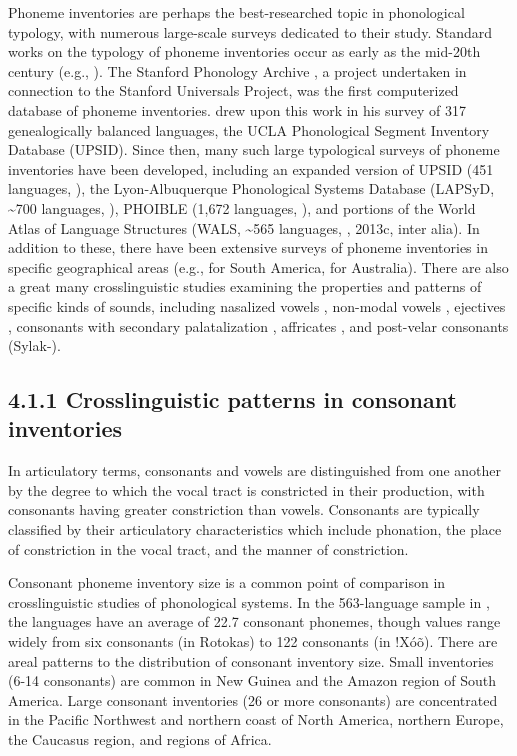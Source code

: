   Phoneme inventories are perhaps the best-researched topic in phonological typology, with numerous large-scale surveys dedicated to their study. Standard works on the typology of phoneme inventories occur as early as the mid-20th century (e.g., \citealt{Hockett1955}). The Stanford Phonology Archive \citep{CrothersEtAl1979}, a project undertaken in connection to the Stanford Universals Project, was the first computerized database of phoneme inventories. \citet{Maddieson1984} drew upon this work in his survey of 317 genealogically balanced languages, the UCLA Phonological Segment Inventory Database (UPSID). Since then, many such large typological surveys of phoneme inventories have been developed, including an expanded version of UPSID (451 languages, \citealt{MaddiesonPrecoda1990}), the Lyon-Albuquerque Phonological Systems Database (LAPSyD, {\textasciitilde}700 languages, \citealt{MaddiesonEtAl2013}), PHOIBLE (1,672 languages, \citealt{MoranEtAl2014}), and portions of the World Atlas of Language Structures (WALS, {\textasciitilde}565 languages, \citealt{Maddieson2013b}, 2013c, inter alia). In addition to these, there have been extensive surveys of phoneme inventories in specific geographical areas (e.g., \citealt{MichaelEtAl2015} for South America, \citealt{GasserBowern2014} for Australia). There are also a great many crosslinguistic studies examining the properties and patterns of specific kinds of sounds, including nasalized vowels \citep{Hajek2013}, non-modal vowels \citep{Gordon1998}, ejectives \citep{Fallon2002}, consonants with secondary palatalization \citep{Hall2000}, affricates \citep{Berns2013}, and post-velar consonants (Sylak-\citealt{Glassman2014}). 

\subsection{4.1.1 Crosslinguistic patterns in consonant inventories}

  In articulatory terms, consonants and vowels are distinguished from one another by the degree to which the vocal tract is constricted in their production, with consonants having greater constriction than vowels. Consonants are typically classified by their articulatory characteristics which include phonation, the place of constriction in the vocal tract, and the manner of constriction.

  Consonant phoneme inventory size is a common point of comparison in crosslinguistic studies of phonological systems. In the 563-language sample in \citet{Maddieson2013b}, the languages have an average of 22.7 consonant phonemes, though values range widely from six consonants (in Rotokas) to 122 consonants (in !Xóõ). There are areal patterns to the distribution of consonant inventory size. Small inventories (6-14 consonants) are common in New Guinea and the Amazon region of South America. Large consonant inventories (26 or more consonants) are concentrated in the Pacific Northwest and northern coast of North America, northern Europe, the Caucasus region, and regions of  Africa.

